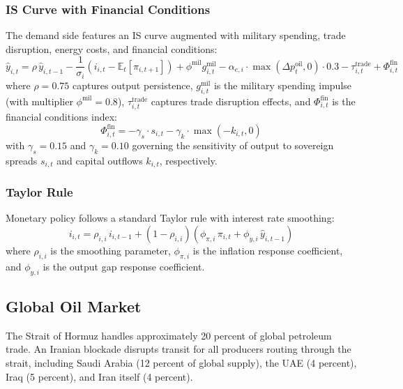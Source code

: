 \documentclass[12pt,a4paper]{article}
\begin{document}
\subsubsection{IS Curve with Financial Conditions}

The demand side features an IS curve augmented with military spending, trade disruption, energy costs, and financial conditions:
\begin{equation}
\hat{y}_{i,t} = \rho \, \hat{y}_{i,t-1} - \frac{1}{\sigma_i}(i_{i,t} - \mathbb{E}_t[\pi_{i,t+1}]) + \phi^{\text{mil}} g^{\text{mil}}_{i,t} - \alpha_{e,i} \cdot \max(\Delta p^{\text{oil}}_t, 0) \cdot 0.3 - \tau^{\text{trade}}_{i,t} + \Phi^{\text{fin}}_{i,t}
\label{eq:is}
\end{equation}
where $\rho = 0.75$ captures output persistence, $g^{\text{mil}}_{i,t}$ is the military spending impulse (with multiplier $\phi^{\text{mil}} = 0.8$), $\tau^{\text{trade}}_{i,t}$ captures trade disruption effects, and $\Phi^{\text{fin}}_{i,t}$ is the financial conditions index:
\begin{equation}
\Phi^{\text{fin}}_{i,t} = -\gamma_s \cdot s_{i,t} - \gamma_k \cdot \max(-k_{i,t}, 0)
\label{eq:fci}
\end{equation}
with $\gamma_s = 0.15$ and $\gamma_k = 0.10$ governing the sensitivity of output to sovereign spreads $s_{i,t}$ and capital outflows $k_{i,t}$, respectively.

\subsubsection{Taylor Rule}

Monetary policy follows a standard Taylor rule with interest rate smoothing:
\begin{equation}
i_{i,t} = \rho_{i,i} \, i_{i,t-1} + (1 - \rho_{i,i})(\phi_{\pi,i} \, \pi_{i,t} + \phi_{y,i} \, \hat{y}_{i,t-1})
\label{eq:taylor}
\end{equation}
where $\rho_{i,i}$ is the smoothing parameter, $\phi_{\pi,i}$ is the inflation response coefficient, and $\phi_{y,i}$ is the output gap response coefficient.


\subsection{Global Oil Market}

The Strait of Hormuz handles approximately 20 percent of global petroleum trade. An Iranian blockade disrupts transit for all producers routing through the strait, including Saudi Arabia (12 percent of global supply), the UAE (4 percent), Iraq (5 percent), and Iran itself (4 percent).
\end{document}
